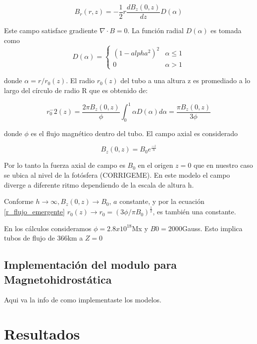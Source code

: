 \documentclass[9pt]{book}
\begin{document}
\begin{equation}
B_r(r,z)=-\frac{1}{2}r\frac{dB_z(0,z)}{dz}D(\alpha)
\end{equation}

Este campo satisface gradiente $ \nabla \cdot B = 0 $. La funci\'on radial $D(\alpha)$ es tomada como
\begin{equation}
 D(\alpha) = 
    \begin{cases}
        (1-alpha^2)^2 & \alpha \leq 1 \\
        0   & \alpha > 1
    \end{cases}
\end{equation}

donde $\alpha = r/r_0(z)$. El radio $r_0(z)$ del tubo a una altura z es promediado a lo largo del c\'irculo de radio R que es obtenido de:

\begin{equation} \label{r_flujo_emergente}
r_0^-2(z) = \frac{2\pi B_z(0,z)}{\phi} \int_{0}^{1} \alpha D(\alpha) d\alpha = \frac{\pi B_z(0,z)}{3 \phi}
\end{equation}

donde $\phi$ es el flujo magn\'etico dentro del tubo.
El campo axial es considerado

\begin{equation}
B_z(0,z)=B_0e^{\frac{-z}{h}}
\end{equation}

Por lo tanto la fuerza axial de campo es $B_0$ en el origen $z=0$ que en nuestro caso se ubica al nivel de la fot\'osfera (CORRIGEME). En este modelo el campo diverge a diferente ritmo dependiendo de la escala de altura h.

Conforme $h\rightarrow \infty , B_z(0,z) \rightarrow B_0$, $a$ constante, y por la ecuaci\'on \ref{r_flujo_emergente} $r_0(z) \rightarrow r_0 = (3\phi / \pi B_0)^\frac{1}{2}$, es tambi\'en una constante.

En los c\'alculos consideramos $\phi=2.8x10^18$Mx y $B0=2000$Gauss. Esto implica tubos de flujo de 366km a $Z=0$


\section{Implementaci\'on del modulo para Magnetohidrost\'atica}
Aqui va la info de como implementaste los modelos.


\chapter{Resultados}
\end{document}
